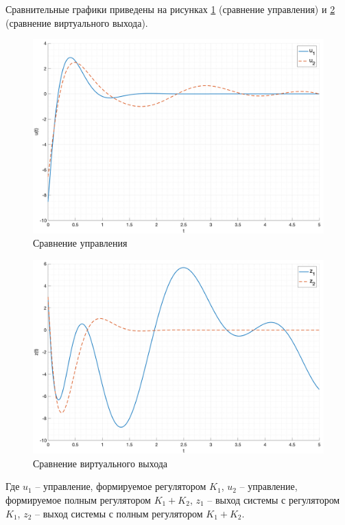 Сравнительные графики приведены на рисунках \ref{fog:task2_cpm_u} (сравнение управления)
и \ref{fog:task2_cpm_z} (сравнение виртуального выхода).
\begin{figure}[ht!]
    \centering
    \includegraphics[width=\textwidth]{media/plots/task2_u_cmp.png}
    \caption{Сравнение управления}
    \label{fog:task2_cpm_u}
\end{figure}
\begin{figure}[ht!]
    \centering
    \includegraphics[width=\textwidth]{media/plots/task2_z_cmp.png}
    \caption{Сравнение виртуального выхода}
    \label{fog:task2_cpm_z}
\end{figure}
Где $u_1$ -- управление, формируемое регулятором $K_1$, $u_2$ -- управление, формируемое полным регулятором $K_1 + K_2$,
$z_1$ -- выход системы с регулятором $K_1$, $z_2$ -- выход системы с полным регулятором $K_1 + K_2$.

